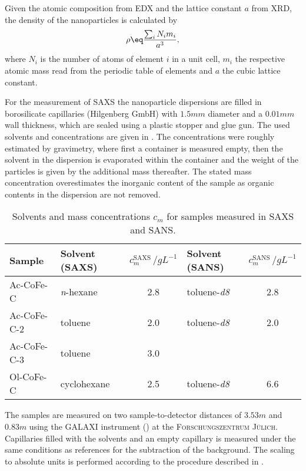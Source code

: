 \documentclass[\main/dresen_thesis.tex]{subfiles}
\begin{document}
    Given the atomic composition from EDX and the lattice constant $a$ from XRD, the density of the nanoparticles is calculated by
    \begin{align}
      \rho \eq \frac{\sum_i N_i m_i}{a^3},
    \end{align}
    where $N_i$ is the number of atoms of element $i$ in a unit cell, $m_i$ the respective atomic mass read from the periodic table of elements and $a$ the cubic lattice constant.

    For the measurement of SAXS the nanoparticle dispersions are filled in borosilicate capillaries (Hilgenberg GmbH) with $1.5 \unit{mm}$ diameter and a $0.01 \unit{mm}$ wall thickness, which are sealed using a plastic stopper and glue gun.
    The used solvents and concentrations are given in .
    The concentrations were roughly estimated by gravimetry, where first a container is measured empty, then the solvent in the dispersion is evaporated within the container and the weight of the particles is given by the additional mass thereafter.
    The stated mass concentration overestimates the inorganic content of the sample as organic contents in the dispersion are not removed.
    \begin{table}[!htbp]
      \centering
      \caption{\label{tab:monolayers:charMethod:sampleConcentrations}Solvents and mass concentrations $c_m$ for samples measured in SAXS and SANS.}
      \begin{tabular}{ l | l | c | l | c }
        \textbf{Sample}  & Solvent (SAXS) & $c_m^\mathrm{SAXS} \,/ \unit{gL^{-1}}$ & Solvent (SANS) & $c_m^\mathrm{SANS}\,/ \unit{gL^{-1}}$\\
        \hline
        Ac-CoFe-C   & \textit{n}-hexane   & 2.8                 & toluene-\textit{d8}       & 2.8\\
        Ac-CoFe-C-2 & toluene             & 2.0                 & toluene-\textit{d8}       & 2.0\\
        Ac-CoFe-C-3 & toluene             & 3.0                 &                           &    \\
        Ol-CoFe-C   & cyclohexane         & 2.5                 & toluene-\textit{d8}       & 6.6\\
        \hline
      \end{tabular}
    \end{table}

    The samples are measured on two sample-to-detector distances of $3.53 \unit{m}$ and $0.83 \unit{m}$ using the GALAXI instrument () at the \textsc{Forschungszentrum J\"ulich}.
    Capillaries filled with the solvents and an empty capillary is measured under the same conditions as references for the subtraction of the background.
    The scaling to absolute units is performed according to the procedure described in .
\end{document}
